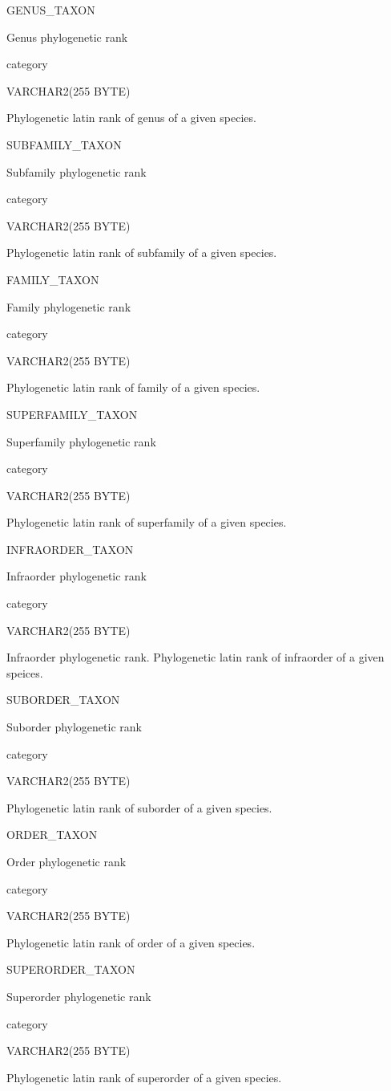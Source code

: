 \documentclass[
  letterpaper,
  oneside,
  open=any]{scrbook}
\begin{document}
GENUS\_TAXON

Genus phylogenetic rank

category

VARCHAR2(255 BYTE)

Phylogenetic latin rank of genus of a given species.

SUBFAMILY\_TAXON

Subfamily phylogenetic rank

category

VARCHAR2(255 BYTE)

Phylogenetic latin rank of subfamily of a given species.

FAMILY\_TAXON

Family phylogenetic rank

category

VARCHAR2(255 BYTE)

Phylogenetic latin rank of family of a given species.

SUPERFAMILY\_TAXON

Superfamily phylogenetic rank

category

VARCHAR2(255 BYTE)

Phylogenetic latin rank of superfamily of a given species.

INFRAORDER\_TAXON

Infraorder phylogenetic rank

category

VARCHAR2(255 BYTE)

Infraorder phylogenetic rank. Phylogenetic latin rank of infraorder of a
given speices.

SUBORDER\_TAXON

Suborder phylogenetic rank

category

VARCHAR2(255 BYTE)

Phylogenetic latin rank of suborder of a given species.

ORDER\_TAXON

Order phylogenetic rank

category

VARCHAR2(255 BYTE)

Phylogenetic latin rank of order of a given species.

SUPERORDER\_TAXON

Superorder phylogenetic rank

category

VARCHAR2(255 BYTE)

Phylogenetic latin rank of superorder of a given species.
\end{document}
